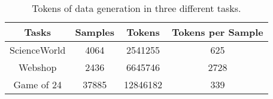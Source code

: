 \begin{table*}[!h]
    \centering
    \begin{tabular}{cccc}
    \toprule
    Tasks	&Samples	&Tokens	&Tokens per Sample  \\
    \midrule
    ScienceWorld	&4064	&2541255	&625\\
    Webshop	&2436	&6645746	&2728 \\
    Game of 24	&37885	&12846182	&339 \\
    \bottomrule
    \end{tabular}
    \caption{Tokens of data generation in three different tasks. 
    }
    \label{tab:overhead}
\end{table*}

